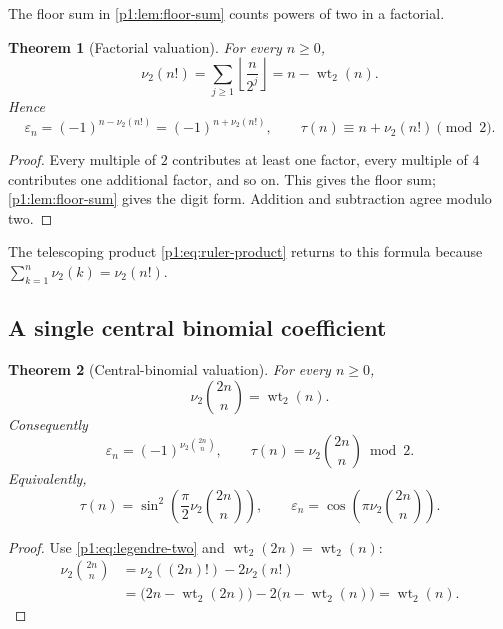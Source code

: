 \documentclass[11pt,oneside]{article}
\numberwithin{equation}{section}
\newtheorem{theorem}{Theorem}[section]
\theoremstyle{definition}
\theoremstyle{remark}
\newcommand{\wt}{\operatorname{wt}_2}
\newcommand{\vtwo}{\nu_2}
\newcommand{\eps}{\varepsilon}
\begin{document}
The floor sum in \cref{p1:lem:floor-sum} counts powers of two in a factorial.

\begin{theorem}[Factorial valuation]
\label{p1:thm:factorial-valuation}
For every \(n\ge0\),
\begin{equation}
  \vtwo(n!)=\sum_{j\ge1}\left\lfloor\frac n{2^j}\right\rfloor
           =n-\wt(n).
  \label{p1:eq:legendre-two}
\end{equation}
Hence
\begin{equation}
  \boxed{
  \eps_n=(-1)^{n-\vtwo(n!)}=(-1)^{n+\vtwo(n!)},
  \qquad
  \tau(n)\equiv n+\vtwo(n!)\pmod2.}
  \label{p1:eq:factorial-thue-morse}
\end{equation}
\end{theorem}

\begin{proof}
Every multiple of \(2\) contributes at least one factor, every multiple of
\(4\) contributes one additional factor, and so on.  This gives the floor
sum; \cref{p1:lem:floor-sum} gives the digit form.  Addition and subtraction agree
modulo two.
\end{proof}

The telescoping product \eqref{p1:eq:ruler-product} returns to this formula because
\(\sum_{k=1}^{n}\vtwo(k)=\vtwo(n!)\).

\subsection{A single central binomial coefficient}

\begin{theorem}[Central-binomial valuation]
\label{p1:thm:central-binomial}
For every \(n\ge0\),
\begin{equation}
  \boxed{
  \vtwo\binom{2n}{n}=\wt(n).}
  \label{p1:eq:central-v2}
\end{equation}
Consequently
\begin{equation}
  \boxed{
  \eps_n=(-1)^{\vtwo\binom{2n}{n}},
  \qquad
  \tau(n)=\vtwo\binom{2n}{n}\bmod2.}
  \label{p1:eq:central-thue-morse}
\end{equation}
Equivalently,
\begin{equation}
  \tau(n)=\sin^2\!\left(\frac\pi2\vtwo\binom{2n}{n}\right),
  \qquad
  \eps_n=\cos\!\left(\pi\vtwo\binom{2n}{n}\right).
  \label{p1:eq:central-trig}
\end{equation}
\end{theorem}

\begin{proof}
Use \eqref{p1:eq:legendre-two} and \(\wt(2n)=\wt(n)\):
\begin{align*}
 \vtwo\binom{2n}{n}
 &=\vtwo((2n)!)-2\vtwo(n!)\\
 &=\bigl(2n-\wt(2n)\bigr)-2\bigl(n-\wt(n)\bigr)
  =\wt(n).
\end{align*}
\end{proof}
\end{document}
